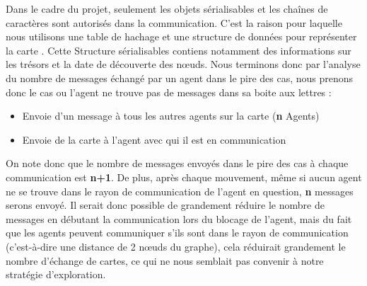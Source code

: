\documentclass[10pt]{article}
\newcommand\tab[1][0.65cm]{\hspace*{#1}}
\begin{document}
\tab Dans le cadre du projet, seulement les objets sérialisables et les chaînes de caractères sont autorisés dans la communication. C'est la raison pour laquelle nous utilisons une table de hachage et une structure de données  pour représenter la carte . Cette Structure  sérialisables contiens notamment des informations sur les trésors et la date de découverte des n\oe{}uds. Nous terminons donc par l'analyse du nombre de messages échangé par un agent dans le pire des cas, nous prenons donc le cas ou l'agent ne trouve pas de messages dans sa boite aux lettres : 
\begin{itemize}
  \item Envoie d'un message à tous les autres agents sur la carte (\textbf{n} Agents)
  \item Envoie de la carte à l'agent avec qui il est en communication
\end{itemize}
On note donc que le nombre de messages envoyés dans le pire des cas à chaque communication est \textbf{n+1}. De plus, après chaque mouvement, même si aucun agent ne se trouve dans le rayon de communication de l'agent en question, \textbf{n} messages serons envoyé. Il serait donc possible de grandement réduire le nombre de messages en débutant la communication lors du blocage de l'agent, mais du fait que les agents peuvent communiquer s'ils sont dans le rayon de communication (c'est-à-dire une distance de 2 n\oe{}uds du graphe), cela réduirait grandement le nombre d'échange de cartes, ce qui ne nous semblait pas convenir à notre stratégie d'exploration. 
\end{document}
